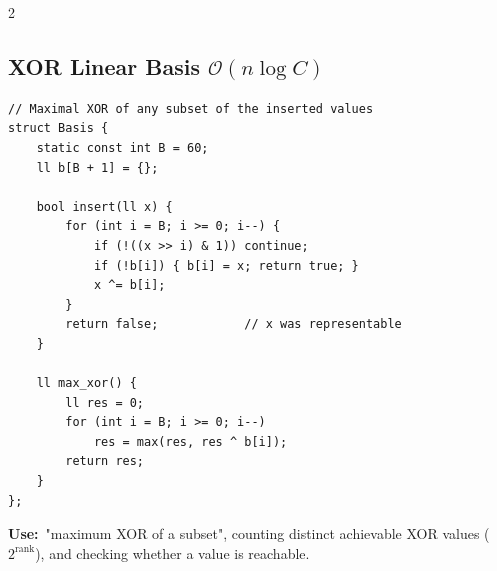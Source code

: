 \documentclass[10pt]{article}
\newcommand{\sub}[2]{\subsection[#1]{#1\hspace{0.6em}%
  \textnormal{\color{accent2}\small$\mathcal{O}(#2)$}}}
\newcommand{\uses}[1]{{\color{accent2}\footnotesize\textbf{Use:}}~{\footnotesize #1}\par}
\begin{document}
\begin{multicols}{2}
\sub{XOR Linear Basis}{n \log C}
\begin{lstlisting}
// Maximal XOR of any subset of the inserted values
struct Basis {
    static const int B = 60;
    ll b[B + 1] = {};

    bool insert(ll x) {
        for (int i = B; i >= 0; i--) {
            if (!((x >> i) & 1)) continue;
            if (!b[i]) { b[i] = x; return true; }
            x ^= b[i];
        }
        return false;            // x was representable
    }

    ll max_xor() {
        ll res = 0;
        for (int i = B; i >= 0; i--)
            res = max(res, res ^ b[i]);
        return res;
    }
};
\end{lstlisting}
\uses{"maximum XOR of a subset", counting distinct achievable XOR
values ($2^{\text{rank}}$), and checking whether a value is reachable.}

\end{multicols}

\end{document}
